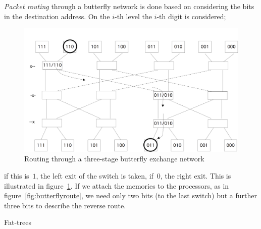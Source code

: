 \emph{Packet routing} through a butterfly
network is done based on considering the bits in the destination
address. On the $i$-th level the $i$-th digit is considered;
\begin{figure}[ht]
  \includegraphics[scale=.18]{graphics/butterfly-route}
  \caption{Routing through a three-stage butterfly exchange network}
  \label{fig:butterfly-route}
\end{figure}
if this is~$1$, the left exit of the switch is taken, if~$0$, the
right exit. This is illustrated in
figure~\ref{fig:butterfly-route}. If we attach the memories to the
processors, as in figure~\ref{fig:butterflyroute}, we need only two
bits (to the last switch) but a further
three bits to describe the reverse route.


 {Fat-trees}
\label{sec:fat-tree}

